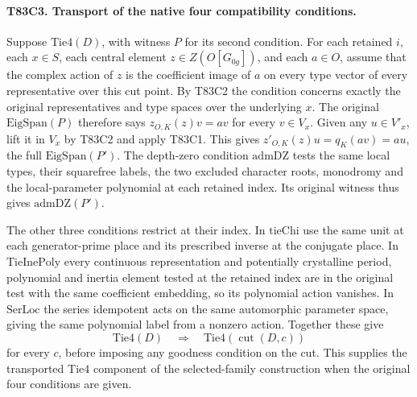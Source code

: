 \paragraph{T83C3. Transport of the native four compatibility conditions.}
Suppose $\mathrm{Tie4}(D)$, with witness $P$ for its second
condition. For each retained $i$, each $x\in S$, each central
element $z\in Z(O[G_{0g}])$, and each $a\in O$, assume that
the complex action of $z$ is the coefficient image of $a$ on
every type vector of every representative over this cut point.
By T83C2 the condition concerns exactly the original representatives
and type spaces over the underlying $x$. The original
$\mathrm{EigSpan}(P)$ therefore says $z_{O,K}(z)v=av$ for
every $v\in V_x$. Given any $u\in V'_x$, lift it in $V_x$ by
T83C2 and apply T83C1. This gives
$z'_{O,K}(z)u=q_K(av)=au$, the full $\mathrm{EigSpan}(P')$.
The depth-zero condition $\mathrm{admDZ}$ tests the same local
types, their squarefree labels, the two excluded character roots,
monodromy and the local-parameter polynomial at each retained
index. Its original witness thus gives $\mathrm{admDZ}(P')$.

The other three conditions restrict at their index. In
$\mathrm{tieChi}$ use the same unit at each generator-prime
place and its prescribed inverse at the conjugate place.
In $\mathrm{TieInePoly}$ every continuous representation and
potentially crystalline period, polynomial and inertia element
tested at the retained index are in the original test with the
same coefficient embedding, so its polynomial action vanishes.
In $\mathrm{SerLoc}$ the series idempotent acts on the same
automorphic parameter space, giving the same polynomial label
from a nonzero action. Together these give
\[
           \mathrm{Tie4}(D)\quad\Longrightarrow\quad
                         \mathrm{Tie4}(\operatorname{cut}(D,c))
\]
for every $c$, before imposing any goodness condition on the cut.
This supplies the transported $\mathrm{Tie4}$ component of the
selected-family construction when the original four conditions
are given.

